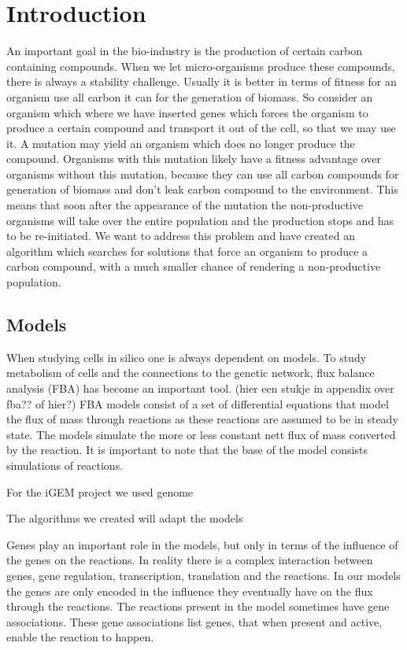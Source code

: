 \documentclass[12pt]{report}
\begin{document}
\section{Introduction}
An important goal in the bio-industry is the production of certain carbon containing compounds. When we let micro-organisms produce these compounds, there is always a stability challenge. Usually it is better in terms of fitness for an organism use all carbon it can for the generation of biomass. So consider an organism which where we have inserted genes which forces the organism to produce a certain compound and transport it out of the cell, so that we may use it. A mutation may yield an organism which does no longer produce the compound. Organisms with this mutation likely have a fitness advantage over organisms without this mutation, because they can use all carbon compounds for generation of biomass and don't leak carbon compound to the environment. This means that soon after the appearance of the mutation the non-productive organisms will take over the entire population and the production stops and has to be re-initiated. We want to address this problem and have created an algorithm which searches for solutions that force an organism to produce a carbon compound, with a much smaller chance of rendering a non-productive population.

\subsection{Models}\label{sec:intro_models}
When studying cells in silico one is always dependent on models. To study metabolism of cells and the connections to the genetic network, flux balance analysis (FBA) has become an important tool. (hier een stukje in appendix over fba?? of hier?)
FBA models consist of a set of differential equations that model the flux of mass through reactions as these reactions are assumed to be in steady state. The models simulate the more or less constant nett flux of mass converted by the reaction.
It is important to note that the base of the model consists simulations of reactions.

For the iGEM project we used genome  

The algorithms we created will adapt the models 

Genes play an important role in the models, but only in terms of the influence of the genes on the reactions.
In reality there is a complex interaction between genes, gene regulation, transcription, translation and the reactions.
In our models the genes are only encoded in the influence they eventually have on the flux through the reactions.
The reactions present in the model sometimes have gene associations.
These gene associations list genes, that when present and active, enable the reaction to happen.
\end{document}
